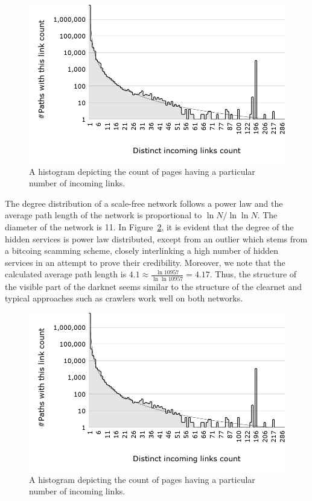 \iflncs
  \begin{figure}
  \vspace{-15pt}
  \centering
  \includegraphics[trim={6cm 1.5cm 5cm 1cm}, width=0.65\linewidth]{images/DistinctIncomingLinksCount.png}
  \caption{A histogram depicting the count of pages having a particular number of incoming links.}
  \label{fig:powerLawAbnormality}
  \end{figure}
\fi
The degree distribution of a scale-free network follows a power law and the average path length of the network is proportional to $\ln{N}/\ln{\ln{N}}$. The diameter of the  network is 11. In Figure~\ref{fig:powerLawAbnormality}, it is evident that the degree of the hidden services is power law distributed, except from an outlier which stems from a bitcoing scamming scheme, closely interlinking a high number of hidden services in an attempt to prove their credibility. Moreover, we note that the calculated average path length is $4.1 \approx \frac{\ln 10957}{\ln\ln 10957} = 4.17$. 
Thus, the structure of the visible part of the darknet seems similar to the structure of the clearnet and typical approaches such as crawlers work well on both networks.

\ifdgruyter
  \begin{figure}[H]
  \includegraphics[width=\linewidth]{images/DistinctIncomingLinksCount.png}
  \caption{A histogram depicting the count of pages having a particular
               number of incoming links.}
  \label{fig:powerLawAbnormality}
  \end{figure}
\fi

